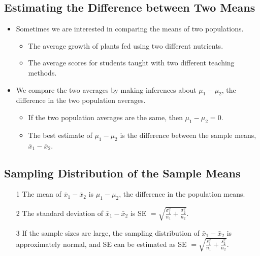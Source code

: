 \documentclass[12pt, letterpaper]{article}
\begin{document}
        \subsection{Estimating the Difference between Two Means}
            \begin{itemize}
                \item Sometimes we are interested in comparing the means of two populations.
                \begin{itemize}
                    \item The average growth of plants fed using two different nutrients.
                    \item The average scores for students taught with two different teaching methods.
                \end{itemize}
                \item We compare the two averages by making inferences about $\mu_1 - \mu_2$, the difference in the two population averages.
                \begin{itemize}
                    \item If the two population averages are the same, then $\mu_1 - \mu_2 = 0$.
                    \item The best estimate of $\mu_1 - \mu_2$ is the difference between the sample means, $\bar{x}_1 - \bar{x}_2$.
                \end{itemize}
            \end{itemize}
        \subsection{Sampling Distribution of the Sample Means}
            \begin{mdframed}[leftmargin=0.5cm, rightmargin=0.5cm]
                \begin{itemize}
                    \item[1] The mean of $\bar{x}_1 - \bar{x}_2$ is $\mu_1 - \mu_2$, the difference in the population means.
                    \item[2] The standard deviation of $\bar{x}_1 - \bar{x}_2$ is SE $= \sqrt{\frac{\sigma^2_1}{n_1} + \frac{\sigma^2_2}{n_2}}$.
                    \item[3] If the sample sizes are large, the sampling distribution of $\bar{x}_1 - \bar{x}_2$ is approximately normal, and SE can be estimated as SE $= \sqrt{\frac{s^2_1}{n_1} + \frac{s^2_2}{n_2}}$.
                \end{itemize}
            \end{mdframed}
\end{document}
